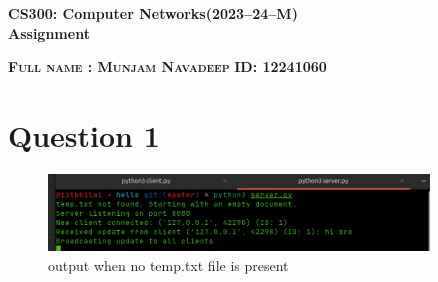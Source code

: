 \documentclass{exam}
\begin{document}
\begin{center}
\textbf{CS300: Computer Networks(2023--24--M)} \\
\textbf{Assignment}
\end{center}

\vspace{0.2in}

\noindent
\textsc{\textbf{Full name : Munjam Navadeep}}  \hspace{1in} \textsc{\textbf{ID: 12241060}}

\vspace{0.2in}


\section*{Question 1}



\begin{figure}[H]
    \centering
    \includegraphics[width=0.9\textwidth]{1stQ.png } 
    \caption{ output when no temp.txt file is present }
    \label{fig:output1}
\end{figure}
\end{document}
